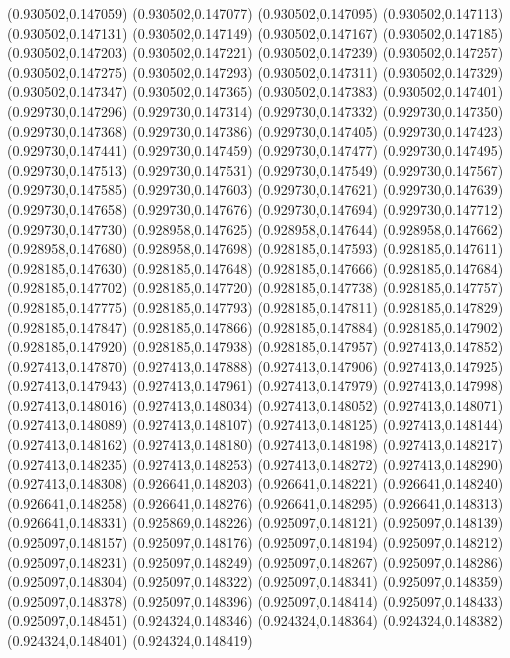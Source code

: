 (0.930502,0.147059)
(0.930502,0.147077)
(0.930502,0.147095)
(0.930502,0.147113)
(0.930502,0.147131)
(0.930502,0.147149)
(0.930502,0.147167)
(0.930502,0.147185)
(0.930502,0.147203)
(0.930502,0.147221)
(0.930502,0.147239)
(0.930502,0.147257)
(0.930502,0.147275)
(0.930502,0.147293)
(0.930502,0.147311)
(0.930502,0.147329)
(0.930502,0.147347)
(0.930502,0.147365)
(0.930502,0.147383)
(0.930502,0.147401)
(0.929730,0.147296)
(0.929730,0.147314)
(0.929730,0.147332)
(0.929730,0.147350)
(0.929730,0.147368)
(0.929730,0.147386)
(0.929730,0.147405)
(0.929730,0.147423)
(0.929730,0.147441)
(0.929730,0.147459)
(0.929730,0.147477)
(0.929730,0.147495)
(0.929730,0.147513)
(0.929730,0.147531)
(0.929730,0.147549)
(0.929730,0.147567)
(0.929730,0.147585)
(0.929730,0.147603)
(0.929730,0.147621)
(0.929730,0.147639)
(0.929730,0.147658)
(0.929730,0.147676)
(0.929730,0.147694)
(0.929730,0.147712)
(0.929730,0.147730)
(0.928958,0.147625)
(0.928958,0.147644)
(0.928958,0.147662)
(0.928958,0.147680)
(0.928958,0.147698)
(0.928185,0.147593)
(0.928185,0.147611)
(0.928185,0.147630)
(0.928185,0.147648)
(0.928185,0.147666)
(0.928185,0.147684)
(0.928185,0.147702)
(0.928185,0.147720)
(0.928185,0.147738)
(0.928185,0.147757)
(0.928185,0.147775)
(0.928185,0.147793)
(0.928185,0.147811)
(0.928185,0.147829)
(0.928185,0.147847)
(0.928185,0.147866)
(0.928185,0.147884)
(0.928185,0.147902)
(0.928185,0.147920)
(0.928185,0.147938)
(0.928185,0.147957)
(0.927413,0.147852)
(0.927413,0.147870)
(0.927413,0.147888)
(0.927413,0.147906)
(0.927413,0.147925)
(0.927413,0.147943)
(0.927413,0.147961)
(0.927413,0.147979)
(0.927413,0.147998)
(0.927413,0.148016)
(0.927413,0.148034)
(0.927413,0.148052)
(0.927413,0.148071)
(0.927413,0.148089)
(0.927413,0.148107)
(0.927413,0.148125)
(0.927413,0.148144)
(0.927413,0.148162)
(0.927413,0.148180)
(0.927413,0.148198)
(0.927413,0.148217)
(0.927413,0.148235)
(0.927413,0.148253)
(0.927413,0.148272)
(0.927413,0.148290)
(0.927413,0.148308)
(0.926641,0.148203)
(0.926641,0.148221)
(0.926641,0.148240)
(0.926641,0.148258)
(0.926641,0.148276)
(0.926641,0.148295)
(0.926641,0.148313)
(0.926641,0.148331)
(0.925869,0.148226)
(0.925097,0.148121)
(0.925097,0.148139)
(0.925097,0.148157)
(0.925097,0.148176)
(0.925097,0.148194)
(0.925097,0.148212)
(0.925097,0.148231)
(0.925097,0.148249)
(0.925097,0.148267)
(0.925097,0.148286)
(0.925097,0.148304)
(0.925097,0.148322)
(0.925097,0.148341)
(0.925097,0.148359)
(0.925097,0.148378)
(0.925097,0.148396)
(0.925097,0.148414)
(0.925097,0.148433)
(0.925097,0.148451)
(0.924324,0.148346)
(0.924324,0.148364)
(0.924324,0.148382)
(0.924324,0.148401)
(0.924324,0.148419)
